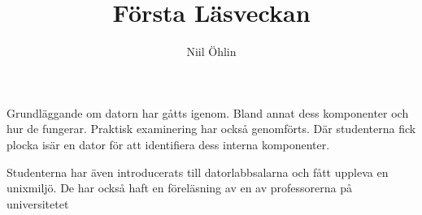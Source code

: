 \documentclass{article}
\begin{document}
\title{Första Läsveckan}
\author{Niil Öhlin}
\date{}
\maketitle

Grundläggande om datorn har gåtts igenom. Bland annat dess komponenter och hur
de fungerar. Praktisk examinering har också genomförts. Där studenterna 
fick plocka isär en dator för att identifiera dess interna komponenter.

Studenterna har även introducerats till datorlabbsalarna och fått uppleva en
unixmiljö. De har också haft en föreläsning av en av professorerna på 
universitetet
\end{document}
